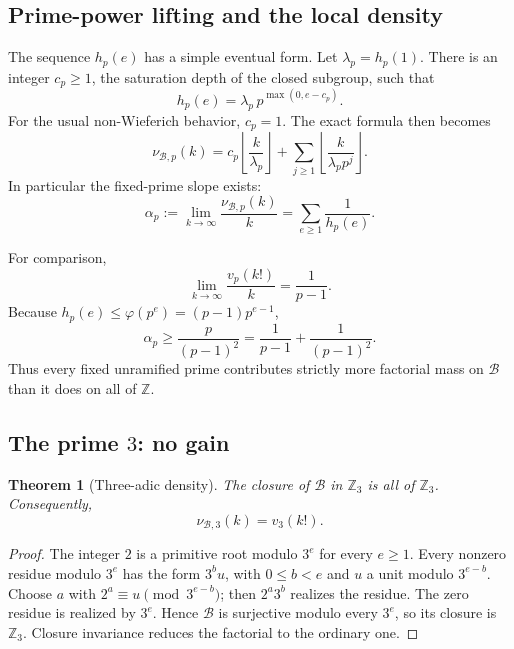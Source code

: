\documentclass[11pt,oneside]{article}
\newtheorem{theorem}{Theorem}[section]
\theoremstyle{definition}
\theoremstyle{remark}
\newcommand{\Z}{\mathbb Z}
\newcommand{\B}{\mathcal B}
\newcommand{\floor}[1]{\left\lfloor #1\right\rfloor}
\begin{document}
\subsection{Prime-power lifting and the local density}

The sequence \(h_p(e)\) has a simple eventual form.  Let \(\lambda_p=h_p(1)\).  There is an
integer \(c_p\ge1\), the saturation depth of the closed subgroup, such that
\begin{equation}
  h_p(e)=\lambda_p\,p^{\max(0,e-c_p)}.
  \label{eq:saturation-depth}
\end{equation}
For the usual non-Wieferich behavior, \(c_p=1\).  The exact formula then becomes
\[
 \nu_{\B,p}(k)
 =c_p\floor{\frac{k}{\lambda_p}}
  +\sum_{j\ge1}\floor{\frac{k}{\lambda_p p^j}}.
\]
In particular the fixed-prime slope exists:
\begin{equation}
 \alpha_p:=\lim_{k\to\infty}\frac{\nu_{\B,p}(k)}{k}
 =\sum_{e\ge1}\frac1{h_p(e)}.
 \label{eq:alpha-p}
\end{equation}

For comparison,
\[
 \lim_{k\to\infty}\frac{v_p(k!)}{k}=\frac1{p-1}.
\]
Because \(h_p(e)\le\varphi(p^e)=(p-1)p^{e-1}\),
\begin{equation}
  \alpha_p\ge\frac{p}{(p-1)^2}
  =\frac1{p-1}+\frac1{(p-1)^2}.
  \label{eq:local-excess-lower}
\end{equation}
Thus every fixed unramified prime contributes strictly more factorial mass on \(\B\) than it
does on all of \(\Z\).

\subsection{The prime \(3\): no gain}

\begin{theorem}[Three-adic density]
\label{thm:p3}
The closure of \(\B\) in \(\Z_3\) is all of \(\Z_3\).  Consequently,
\begin{equation}
  \boxed{\nu_{\B,3}(k)=v_3(k!).}
  \label{eq:p3-main}
\end{equation}
\end{theorem}

\begin{proof}
The integer \(2\) is a primitive root modulo \(3^e\) for every \(e\ge1\).  Every nonzero
residue modulo \(3^e\) has the form \(3^b u\), with \(0\le b<e\) and \(u\) a unit modulo
\(3^{e-b}\).  Choose \(a\) with \(2^a\equiv u\pmod{3^{e-b}}\); then \(2^a3^b\) realizes the
residue.  The zero residue is realized by \(3^e\).  Hence \(\B\) is surjective modulo every
\(3^e\), so its closure is \(\Z_3\).  Closure invariance reduces the factorial to the ordinary
one.
\end{proof}
\end{document}
